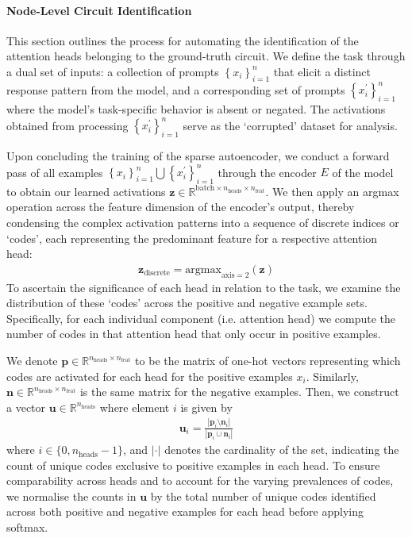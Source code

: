 \documentclass[11pt]{scrartcl}
\begin{document}
\paragraph{Node-Level Circuit Identification}
This section outlines the process for automating the identification of the attention heads belonging to the ground-truth circuit. We define the task through a dual set of inputs: a collection of prompts $\left\{x_i\right\}_{i=1}^n$ that elicit a distinct response pattern from the model, and a corresponding set of prompts $\left\{x_i^\prime\right\}_{i=1}^n$ where the model's task-specific behavior is absent or negated. The activations obtained from processing $\left\{x_i^\prime\right\}_{i=1}^n$ serve as the `corrupted' dataset for analysis.

Upon concluding the training of the sparse autoencoder, we conduct a forward pass of all examples $\left\{x_i\right\}_{i=1}^n \bigcup \left\{x_i^\prime\right\}_{i=1}^n$ through the encoder $E$ of the model to obtain our learned activations $\mathbf{z} \in \mathbb{R}^{\text{batch}\times n_\text{heads}\times n_\text{feat}}$. We then apply an argmax operation across the feature dimension of the encoder's output, thereby condensing the complex activation patterns into a sequence of discrete indices or `codes', each representing the predominant feature for a respective attention head:
\begin{align*}
\mathbf{z}_\text{discrete} = \text{argmax}_{\text{axis}=2}(\mathbf{z})
\end{align*}
To ascertain the significance of each head in relation to the task, we examine the distribution of these `codes' across the positive and negative example sets. Specifically, for each individual component (i.e. attention head) we compute the number of codes in that attention head that only occur in positive examples.

We denote $\mathbf{p} \in \mathbb{R}^{n_\text{heads} \times n_\text{feat}}$ to be the matrix of one-hot vectors representing which codes are activated for each head for the positive examples $x_i$. Similarly, $\mathbf{n} \in \mathbb{R}^{n_\text{heads} \times n_\text{feat}}$ is the same matrix for the negative examples. Then, we construct a vector $\mathbf{u}\in \mathbb{R}^{n_\text{heads}}$ where element $i$ is given by
\begin{align*}
\mathbf{u}_i = \frac{|\mathbf{p}_i \setminus \mathbf{n}_i|}{|\mathbf{p}_i \cup \mathbf{n}_i|}
\end{align*}
where $i \in \{0, n_\text{heads}-1\}$, and $|\cdot|$ denotes the cardinality of the set, indicating the count of unique codes exclusive to positive examples in each head. To ensure comparability across heads and to account for the varying prevalences of codes, we normalise the counts in $\mathbf{u}$ by the total number of unique codes identified across both positive and negative examples for each head before applying softmax.
\end{document}
